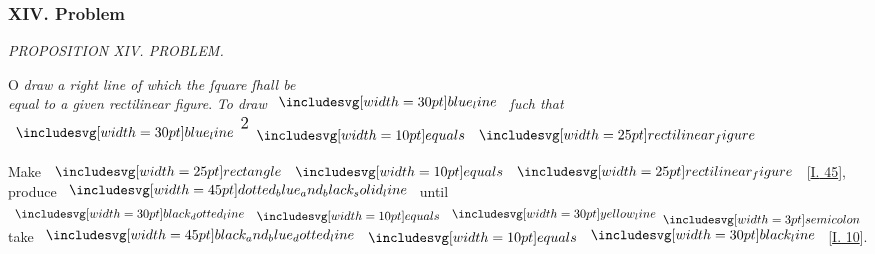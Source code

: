 \documentclass[12pt,preview]{standalone}
\begin{document}
\subsubsection{XIV. Problem}

\begin{minipage}[t]{0.33\textwidth}
    \vspace{0pt}
    
\end{minipage}%
\hfill
\begin{minipage}[t]{0.64\textwidth}
    \vspace{0pt}

    \begin{center}
        \textit{PROPOSITION XIV. PROBLEM.}\label{book2pr14} \\
    \end{center}

    \hfill

    \begin{center}
        \raggedright \lettrine[lines=4, loversize=1, nindent=0pt]{}{}O \textit{draw a right line of which the ſquare ſhall be\\ equal to a given rectilinear figure}. \textit{To draw} $\blueline$ \textit{ſuch that} $\blueline^{\text{\large 2}} \bequals \img{rectilinear_figure}$
    \end{center}

    \hfill

    \hfill

    \begin{center}
        Make $\img{rectangle} \bequals \img{rectilinear_figure}$ [\hyperref[book1pr45]{\textsc{I.} 45}],\\
        produce $\bimg{dotted_blue_and_black_solid_line}$ until $\dottedblackline \bequals \yellowline \bsemicolon$\\
        take $\bimg{black_and_blue_dotted_line} \bequals \blackline$ [\hyperref[book1pr10]{\textsc{I.} 10}].\\
    \end{center}

    \hfill


\end{minipage}
\end{document}
